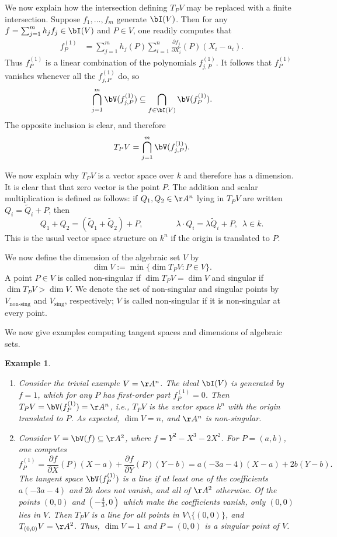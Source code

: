 \documentclass[12pt]{amsart}
\theoremstyle{plain}
\newtheorem{example}[theorem]{Example}
\begin{document}
We now explain how the intersection defining $T_PV$ may be replaced with a finite intersection.
Suppose $f_1, \ldots, f_m$ generate $\bI(V)$.
Then for any $f = \sum_{j=1}^m h_j f_j \in \bI(V)$ and $P \in V$, one readily computes that
\begin{align*}
	f_P^{(1)} &= \sum_{j=1}^m h_j(P) \sum_{i=1}^n \frac{\partial f_j}{\partial X_i}(P)(X_i-a_i).
\end{align*}
Thus $f_P^{(1)}$ is a linear combination of the polynomials $f_{j,P}^{(1)}$.
It follows that $f_P^{(1)}$ vanishes whenever all the $f_{j,P}^{(1)}$ do, so
$$\bigcap_{j=1}^m \bV(f_{j,P}^{(1)}) \subseteq \bigcap_{f \in \bI(V)} \bV(f_P^{(1)}).$$
The opposite inclusion is clear, and therefore
$$T_PV=\bigcap_{j=1}^m \bV(f_{j,P}^{(1)}).$$

We now explain why $T_PV$ is a vector space over $k$ and therefore has a dimension.
It is clear that that zero vector is the point $P$.
The addition and scalar multiplication is defined as follows: if $Q_1, Q_2 \in \AA^n$ lying in $T_PV$ are written $Q_i = \tilde Q_i + P$, then
$$Q_1 + Q_2 = (\tilde Q_1 + \tilde Q_2) + P, \qquad\qquad \lambda \cdot Q_i = \lambda \tilde Q_i + P, \,\,\, \lambda \in k.$$
This is the usual vector space structure on $k^n$ if the origin is translated to $P$.

We now define the dimension of the algebraic set $V$ by
$$\dim V := \min\{\dim T_PV : P \in V\}.$$
A point $P \in V$ is called non-singular if $\dim T_PV = \dim V$ and singular if $\dim T_P V > \dim V$.
We denote the set of non-singular and singular points by $V_{\text{non-sing}}$ and $V_{\text{sing}}$, respectively;
$V$ is called non-singular if it is non-singular at every point.

We now give examples computing tangent spaces and dimensions of algebraic sets.

\begin{example}
\begin{enumerate}
\item
Consider the trivial example $V = \AA^n$.
The ideal $\bI(V)$ is generated by $f = 1$, which for any $P$ has first-order part $f_P^{(1)} = 0$.
Then $T_PV = \bV(f_P^{(1)}) = \AA^n$, i.e., $T_PV$ is the vector space $k^n$ with the origin translated to $P$.
As expected, $\dim V = n$, and $\AA^n$ is non-singular.

\item
Consider $V = \bV(f) \subseteq \AA^2$, where $f = Y^2 - X^3 - 2X^2$.
For $P = (a, b)$, one computes
$$f_P^{(1)} = \frac{\partial f}{\partial X}(P)(X-a) + \frac{\partial f}{\partial Y}(P)(Y-b) = a(-3a-4)(X - a) + 2b(Y-b).$$ 
The tangent space $\bV(f_P^{(1)})$ is a line if at least one of the coefficients $a(-3a-4)$ and $2b$ does not vanish, and all of $\AA^2$ otherwise.
Of the points $(0, 0)$ and $(-\frac{4}{3}, 0)$ which make the coefficients vanish, only $(0, 0)$ lies in $V$.
Then $T_PV$ is a line for all points in $V\setminus\{(0, 0)\}$, and $T_{(0,0)}V = \AA^2$.
Thus, $\dim V = 1$ and $P = (0, 0)$ is a singular point of $V$.
\end{enumerate}
\end{example}
\end{document}
